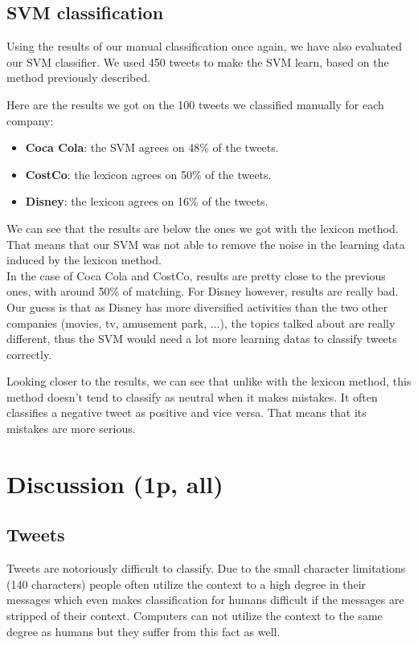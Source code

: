 \documentclass[a4paper,12pt]{report}
\begin{document}
\section{SVM classification}

Using the results  of our manual classification once again, we have also evaluated our SVM classifier.
We used 450 tweets to make the SVM learn, based on the method previously described.

Here are the results we got on the 100 tweets we classified manually for each company:
\begin{itemize}
        \item \textbf{Coca Cola}: the SVM agrees on 48\% of the tweets.
        \item \textbf{CostCo}: the lexicon agrees on 50\% of the tweets.
        \item \textbf{Disney}: the lexicon agrees on 16\% of the tweets.
\end{itemize}
We can see that the results are below the ones we got with the lexicon method.
That means that our SVM was not able to remove the noise in the learning data induced by the lexicon method.\\
In the case of Coca Cola and CostCo, results are pretty close to the previous ones, with around 50\% of matching.
For Disney however, results are really bad. Our guess  is that as Disney has more diversified activities than the two other companies (movies, tv, amusement park, ...), the topics talked about are really different, thus the SVM would need a lot more learning datas to classify tweets correctly.

Looking closer to the results, we can see that unlike with the lexicon method, this method doesn't tend to classify as neutral when it makes mistakes.
It often classifies a negative tweet as positive and vice versa.
That means that its mistakes are more serious.

\chapter{Discussion (1p, all)}

\section{Tweets}
Tweets are notoriously difficult to classify. Due to the small character limitations (140 characters) people often utilize the context to a high degree in their messages which even makes classification for humans difficult if the messages are stripped of their context. Computers can not utilize the context to the same degree as humans but they suffer from this fact as well.
\end{document}
